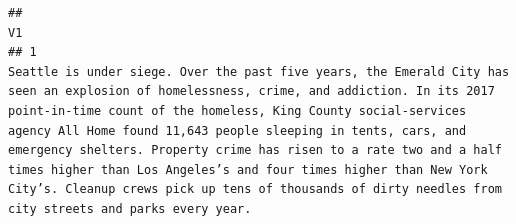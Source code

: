 \documentclass[
]{article}
\begin{document}
\begin{verbatim}
##                                                                                                                                                                                                                                                                                                                                                                                                                                                                                                                                                                                                                                                                                                                                                                                                                                                                                                                                                                                                                                                                                                                                                                                                       V1
## 1                                                                                                                                                                                                                                                                                                                                                                                                                                                                                                                                                                                                                                                                       Seattle is under siege. Over the past five years, the Emerald City has seen an explosion of homelessness, crime, and addiction. In its 2017 point-in-time count of the homeless, King County social-services agency All Home found 11,643 people sleeping in tents, cars, and emergency shelters. Property crime has risen to a rate two and a half times higher than Los Angeles’s and four times higher than New York City’s. Cleanup crews pick up tens of thousands of dirty needles from city streets and parks every year.

\end{verbatim}
\end{document}
